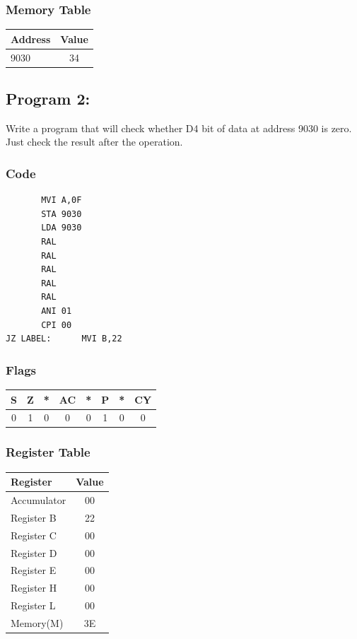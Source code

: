 \documentclass[]{report}
\begin{document}
\subsubsection {Memory Table}
\begin{tabular}{lc}
    \hline
    Address & Value  \\
    \hline
    9030       &      34         \\
    \hline
\end{tabular}
\vspace{10mm}




\subsection*{Program 2: }
Write a program that will check whether D4 bit of data at address 9030 is zero. Just check the result after the operation.
\subsubsection{Code}
\begin{verbatim}
	   MVI A,0F
	   STA 9030
	   LDA 9030
	   RAL
	   RAL
	   RAL
	   RAL
	   RAL
	   ANI 01
	   CPI 00
JZ LABEL:	   MVI B,22
\end{verbatim}
\subsubsection{Flags}
\begin{tabular}{cccccccc}
\hline
    S & Z & *  & AC & *  & P & *  & CY  \\
    \hline
    0&1&0&0&0&1&0&0 \\
    \hline
\end{tabular}
\subsubsection {Register Table}
\begin{tabular}{lc}
    \hline
    Register & Value\\
    \hline
    Accumulator     & 00        \\
    Register B      &  22        \\
    Register C      &  00        \\
    Register D      &   00       \\
    Register E      &   00       \\
    Register H      &  00        \\
    Register L      &  00         \\
    Memory(M)       &      3E         \\
    \hline
\end{tabular}
\end{document}
